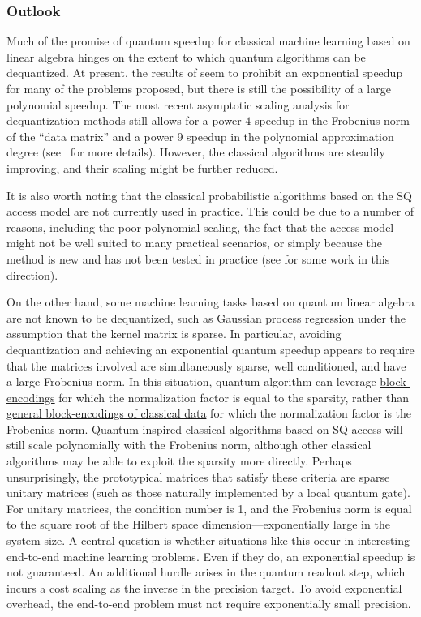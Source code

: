 \begin{refsection}
\subsubsection*{Outlook}

Much of the promise of quantum speedup for classical machine learning based on linear algebra hinges on the extent to which quantum algorithms can be dequantized. 
At present, the results of  \cite{tang2018QInspiredClassAlgPCA} seem to prohibit an exponential speedup for many of the problems proposed, but there is still the possibility of a large polynomial speedup. The most recent asymptotic scaling analysis \cite{chia2022sampling} for dequantization methods still allows for a power $4$ speedup  in the Frobenius norm of the ``data matrix'' and a power 9 speedup  in the polynomial approximation degree (see~\cite{bakshi2023improved} for more details). However, the classical algorithms are steadily improving, and their scaling might be further reduced.

It is also worth noting that the classical probabilistic algorithms based on the SQ access model are not currently used in practice. This could be due to a number of reasons, including the poor polynomial scaling, the fact that the access model might not be well suited to many practical scenarios, or simply because the method is new and has not been tested in practice (see \cite{arrazola2019QInspiredInPractice,chepurko2022quantumInspiredRandomized} for some work in this direction).

On the other hand, some machine learning tasks based on quantum linear algebra are not known to be dequantized, such as Gaussian process regression under the assumption that the kernel matrix is sparse. In particular, avoiding dequantization and achieving an exponential quantum speedup appears to require that the matrices involved are simultaneously sparse, well conditioned, and have a large Frobenius norm. In this situation, quantum algorithm can leverage \hyperref[prim:BlockEncodings]{block-encodings} for which the normalization factor is equal to the sparsity, rather than \hyperref[prim:BlockEncodingsClassical]{general block-encodings of classical data} for which the normalization factor is the Frobenius norm. Quantum-inspired classical algorithms based on SQ access will still scale polynomially with the Frobenius norm, although other classical algorithms may be able to exploit the sparsity more directly. Perhaps unsurprisingly, the prototypical matrices that satisfy these criteria are sparse unitary matrices (such as those naturally implemented by a local quantum gate). For unitary matrices, the condition number is 1,  and the Frobenius norm is equal to the square root of the Hilbert space dimension---exponentially large in the system size. A central question is whether situations like this occur in interesting end-to-end machine learning problems. Even if they do, an exponential speedup is not guaranteed. An additional hurdle arises in the quantum readout step, which incurs a cost scaling as the inverse in the precision target. To avoid exponential overhead, the end-to-end problem must not require exponentially small precision. 




\end{refsection}
